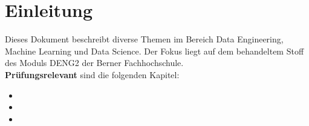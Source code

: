 \newpage
\section{Einleitung}
\label{sec:stat}


Dieses Dokument beschreibt diverse Themen im Bereich Data Engineering, Machine Learning und Data Science. Der Fokus liegt auf dem behandeltem Stoff des Moduls DENG2 der Berner Fachhochschule. \\

\textbf{Prüfungsrelevant} sind die folgenden Kapitel:

\begin{itemize}
  \item {}
  \item {}
  \item {}
\end{itemize}
